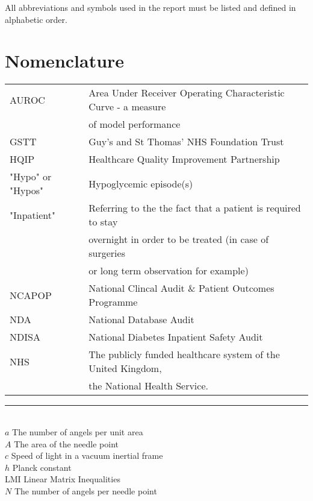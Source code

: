 All abbreviations and symbols used in the report must be listed and defined in alphabetic order.

\section*{Nomenclature}

\begin{flushleft}
\begin{minipage}{1\textwidth}
    	\centering
        \def\arraystretch{1.25}%
    	\begin{tabular}{ll}

			AUROC & Area Under Receiver Operating Characteristic Curve - a measure \\
			& of model performance \\
			GSTT  & Guy's and St Thomas' NHS Foundation Trust \\
			HQIP & Healthcare Quality Improvement Partnership \\
			"Hypo" or "Hypos" & Hypoglycemic episode(s) \\

			"Inpatient" & Referring to the the fact that a patient is required to stay \\ 
			& overnight in order to be treated (in case of surgeries \\  
			& or long term observation for example) \\

			NCAPOP & National Clincal Audit \& Patient Outcomes Programme \\
			NDA   & National Database Audit  \\
    		NDISA & National Diabetes Inpatient Safety Audit \\  
    		NHS & The publicly funded healthcare system of the United Kingdom, \\ 
            & the National Health Service. \\
			
      
                
    	\end{tabular}
\end{minipage}

\end{flushleft}

\noindent\rule{8cm}{0.4pt} \\ %
$a$ \qquad The number of angels per unit area\\
$A$ \qquad The area of the needle point\\
$c$ \qquad Speed of light in a vacuum inertial frame\\
$h$ \qquad Planck constant\\
LMI	\qquad Linear Matrix Inequalities\\
$N$ \qquad The number of angels per needle point